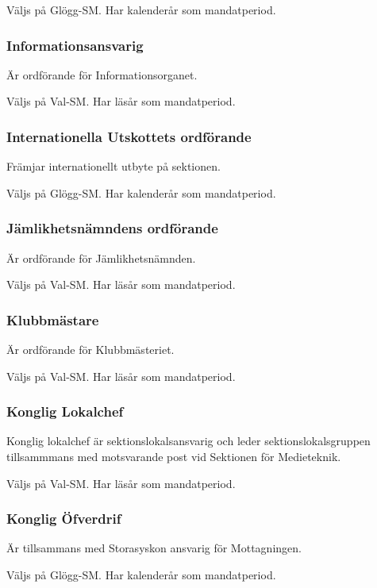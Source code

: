 \documentclass{dgovdoc}
\begin{document}
Väljs på Glögg-SM. Har kalenderår som mandatperiod.

\subsubsection{Informationsansvarig}

Är ordförande för Informationsorganet.

Väljs på Val-SM. Har läsår som mandatperiod.

\subsubsection{Internationella Utskottets ordförande}

Främjar internationellt utbyte på sektionen.

Väljs på Glögg-SM. Har kalenderår som mandatperiod.

\subsubsection{Jämlikhetsnämndens ordförande}

Är ordförande för Jämlikhetsnämnden.

Väljs på Val-SM. Har läsår som mandatperiod.

\subsubsection{Klubbmästare}

Är ordförande för Klubbmästeriet.

Väljs på Val-SM. Har läsår som mandatperiod.

\subsubsection{Konglig Lokalchef}

Konglig lokalchef är sektionslokalsansvarig och leder sektionslokalsgruppen
tillsammmans med motsvarande post vid Sektionen för Medieteknik.

Väljs på Val-SM. Har läsår som mandatperiod.

\subsubsection{Konglig Öfverdrif}

Är tillsammans med Storasyskon ansvarig för Mottagningen.

Väljs på Glögg-SM. Har kalenderår som mandatperiod.
\end{document}
